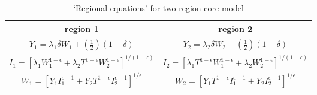 \renewcommand{\arraystretch}{1.8}

\begin{table}[!hbt]
\begin{center}

\begin{tabular}{|c|c|}
\hline 
region 1 & region 2\tabularnewline
\hline
\hline 
$Y_{1}=\lambda_{1}\delta W_{1}+(\frac{1}{2})(1-\delta)$ & $Y_{2}=\lambda_{2}\delta W_{2}+(\frac{1}{2})(1-\delta)$\tabularnewline
\hline 
$I_{1}=\left[\lambda_{1}W_{1}^{1-\epsilon}+\lambda_{2}T^{1-\epsilon}W_{2}^{1-\epsilon}\right]^{1/(1-\epsilon)}$ & $I_{2}=\left[\lambda_{1}T^{1-\epsilon}W_{1}^{1-\epsilon}+\lambda_{2}W_{2}^{1-\epsilon}\right]^{1/(1-\epsilon)}$\tabularnewline
\hline 
$W_{1}=\left[Y_{1}I_{1}^{\epsilon-1}+Y_{2}T^{1-\epsilon}I_{2}^{\epsilon-1}\right]^{1/\epsilon}$ & $W_{2}=\left[Y_{1}T^{1-\epsilon}I_{1}^{\epsilon-1}+Y_{2}I_{2}^{\epsilon-1}\right]^{1/\epsilon}$\tabularnewline
\hline
\end{tabular}

\caption{`Regional equations' for two-region core model \label{tab:op_eqs_coremodel}}
\end{center}
\end{table}

